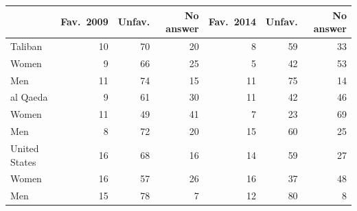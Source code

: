 \begin{tabular}{lrrrrrr}
\toprule
 & Fav.\ 2009 & Unfav. & No answer & Fav.\ 2014 & Unfav. & No answer \\
\midrule
Taliban & 10 & 70 & 20 & 8 & 59 & 33 \\
\quad Women & 9 & 66 & 25 & 5 & 42 & 53 \\
\quad Men & 11 & 74 & 15 & 11 & 75 & 14 \\
\midrule
al Qaeda & 9 & 61 & 30 & 11 & 42 & 46 \\
\quad Women & 11 & 49 & 41 & 7 & 23 & 69 \\
\quad Men & 8 & 72 & 20 & 15 & 60 & 25 \\
\midrule
United States & 16 & 68 & 16 & 14 & 59 & 27 \\
\quad Women & 16 & 57 & 26 & 16 & 37 & 48 \\
\quad Men & 15 & 78 & 7 & 12 & 80 & 8 \\
\bottomrule
\end{tabular}
